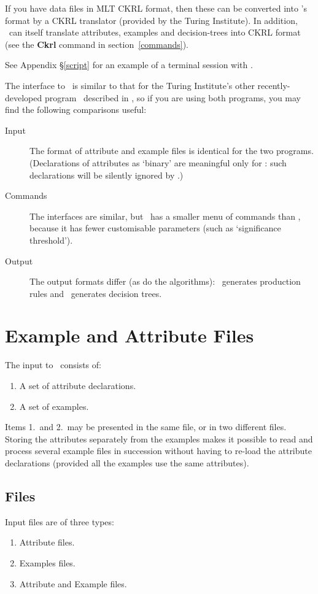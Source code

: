 If you have data files in MLT CKRL format, then these
can be converted into \CN's format by 
a CKRL translator (provided by the Turing Institute).
In addition, \CN\ can itself translate attributes, examples
and decision-trees into CKRL format (see the {\bf Ckrl} command
in section~\ref{commands}).

   See Appendix \S\ref{script} for an example of a terminal
session with \CN.

   The interface to \CN\ is similar to that for the Turing Institute's
other recently-developed program \ID\, described in \cite{mlt:10}, so 
if you are 
using both programs, you may find the following comparisons useful:

\begin{description}
 \item[Input]  The format of attribute and example files is
  identical for the two programs.  (Declarations of attributes
  as `binary' are meaningful only for \ID: such declarations will 
  be silently ignored by \CN.)

 \item[Commands] The interfaces are similar, but \ID\ has a smaller
   menu of commands
  than \CN, because it has fewer customisable parameters
   (such as `significance threshold').

 \item[Output] The output formats differ (as do the algorithms):
 \CN\ generates production rules and \ID\ generates decision trees.
\end{description}

\section{Example and Attribute Files}
\label{input}

The input to \CN\ consists of:
\begin{enumerate}
 \item A set of attribute declarations.
 \item A set of examples.
\end{enumerate}

Items 1.\ and 2.\ may be presented in the same file, or in two different
files.  Storing the attributes separately from the examples makes 
it possible to read and process several example files in succession
without having to re-load the attribute declarations (provided all
the examples use the same attributes).

\subsection{Files}
Input files are of three types:
\begin{enumerate}
 \item Attribute files.
 \item Examples files.
 \item Attribute and Example files.
\end{enumerate}

